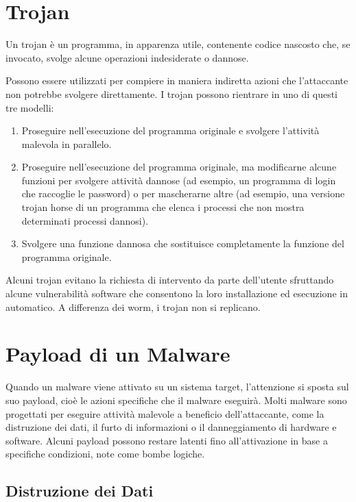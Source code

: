\section{Trojan}

Un trojan è un programma, in apparenza utile, contenente codice nascosto che, se invocato, svolge alcune operazioni indesiderate o dannose.

Possono essere utilizzati per compiere in maniera indiretta azioni che l'attaccante non potrebbe svolgere direttamente. I trojan possono rientrare in uno di questi tre modelli:

\begin{enumerate}
    \item Proseguire nell'esecuzione del programma originale e svolgere l'attività malevola in parallelo.
    \item Proseguire nell'esecuzione del programma originale, ma modificarne alcune funzioni per svolgere attività dannose (ad esempio, un programma di login che raccoglie le password) o per mascherarne altre (ad esempio, una versione trojan horse di un programma che elenca i processi che non mostra determinati processi dannosi).
    \item Svolgere una funzione dannosa che sostituisce completamente la funzione del programma originale.
\end{enumerate}

Alcuni trojan evitano la richiesta di intervento da parte dell'utente sfruttando alcune vulnerabilità software che consentono la loro installazione ed esecuzione in automatico. A differenza dei worm, i trojan non si replicano.

\section{Payload di un Malware}

Quando un malware viene attivato su un sistema target, l'attenzione si sposta sul suo payload, cioè le azioni specifiche che il malware eseguirà. Molti malware sono progettati per eseguire attività malevole a beneficio dell'attaccante, come la distruzione dei dati, il furto di informazioni o il danneggiamento di hardware e software. Alcuni payload possono restare latenti fino all'attivazione in base a specifiche condizioni, note come bombe logiche.

\subsection{Distruzione dei Dati}

